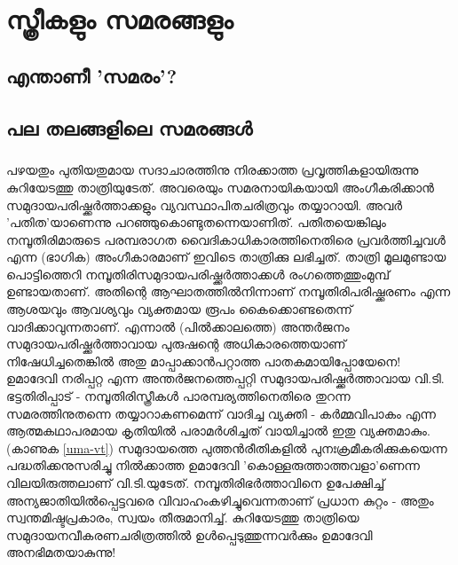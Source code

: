 \chapter{സ്ത്രീകളും സമരങ്ങളും}
\label{chapter11}
\section{എന്താണീ 'സമരം'?}
\section{പല തലങ്ങളിലെ സമരങ്ങൾ}
\label{ch11box1} %
\begin{tcolorbox}[%
 breakable, %
  arc=0mm, 
  left=1pt, right = 1pt, 
  boxrule=0mm,
  colback = {blue!10}, %
] 
\end{tcolorbox}
\paragraph{}
\label{umadevi}
പഴയതും പുതിയതുമായ സദാചാരത്തിനു നിരക്കാത്ത പ്രവൃത്തികളായിരുന്നു കുറിയേടത്തു താത്രിയുടേത്. അവരെയും സമരനായികയായി അംഗീകരിക്കാൻ സമുദായപരിഷ്ക്കർത്താക്കളും വ്യവസ്ഥാപിതചരിത്രവും തയ്യാറായി. അവർ 'പതിത'യാണെന്നു പറഞ്ഞുകൊണ്ടുതന്നെയാണിത്. പതിതയെങ്കിലും നമ്പൂതിരിമാരുടെ പരമ്പരാഗത വൈദികാധികാരത്തിനെതിരെ പ്രവർത്തിച്ചവൾ എന്ന (ഭാഗിക) അംഗീകാരമാണ് ഇവിടെ താത്രിക്കു ലഭിച്ചത്. താത്രി മൂലമുണ്ടായ പൊട്ടിത്തെറി നമ്പൂതിരിസമുദായപരിഷ്ക്കർത്താക്കൾ രംഗത്തെത്തുംമുമ്പ് ഉണ്ടായതാണ്. അതിന്റെ ആഘാതത്തിൽനിന്നാണ് നമ്പൂതിരിപരിഷ്ക്കരണം എന്ന ആശയവും ആവശ്യവും വ്യക്തമായ രൂപം കൈക്കൊണ്ടതെന്ന് വാദിക്കാവുന്നതാണ്. എന്നാൽ (പിൽക്കാലത്തെ) അന്തർജനം സമുദായപരിഷ്ക്കർത്താവായ പുരുഷന്റെ അധികാരത്തെയാണ് നിഷേധിച്ചതെങ്കിൽ അതു മാപ്പാക്കാൻപറ്റാത്ത പാതകമായിപ്പോയേനെ! ഉമാദേവി നരിപ്പറ്റ എന്ന അന്തർജനത്തെപ്പറ്റി സമുദായപരിഷ്ക്കർത്താവായ വി.ടി. ഭട്ടതിരിപ്പാട് - നമ്പൂതിരിസ്ത്രീകൾ പാരമ്പര്യത്തിനെതിരെ തുറന്ന സമരത്തിനുതന്നെ തയ്യാറാകണമെന്ന് വാദിച്ച വ്യക്തി - കർമ്മവിപാകം എന്ന ആത്മകഥാപരമായ കൃതിയിൽ പരാമർശിച്ചത് വായിച്ചാൽ ഇതു വ്യക്തമാകും. (കാണുക \ref{uma-vt}) സമുദായത്തെ പുത്തൻരീതികളിൽ പുനഃക്രമീകരിക്കുകയെന്ന പദ്ധതിക്കനുസരിച്ചു നിൽക്കാത്ത ഉമാദേവി 'കൊള്ളരുത്താത്തവളാ'ണെന്ന വിലയിരുത്തലാണ് വി.ടി.യുടേത്. നമ്പൂതിരിഭർത്താവിനെ ഉപേക്ഷിച്ച് അന്യജാതിയിൽപ്പെട്ടവരെ വിവാഹംകഴിച്ചുവെന്നതാണ് പ്രധാന കുറ്റം - അതും സ്വന്തമിഷ്ടപ്രകാരം, സ്വയം തീരുമാനിച്ച്. കുറിയേടത്തു താത്രിയെ സമുദായനവീകരണചരിത്രത്തിൽ ഉൾപ്പെടുത്തുന്നവർക്കും ഉമാദേവി അനഭിമതയാകുന്നു!


